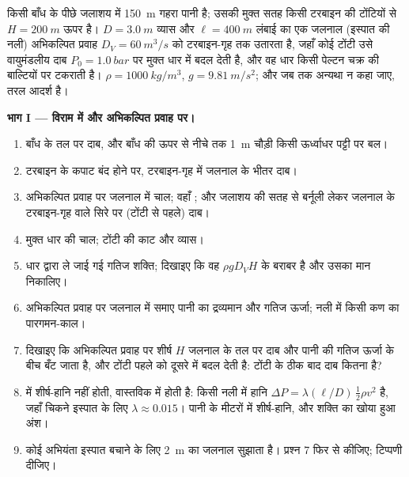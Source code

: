 \begin{problem}
\label{pb:b2:euler-bernoulli:1}

किसी बाँध के पीछे जलाशय में \qty{150}{m} गहरा पानी है; उसकी मुक्त सतह
किसी टरबाइन की टोंटियों से $H = \qty{200}{m}$ ऊपर है। $D = \qty{3.0}{m}$
व्यास और $\ell = \qty{400}{m}$ लंबाई का एक जलनाल (इस्पात की नली)
अभिकल्पित प्रवाह $D_V = \qty{60}{m^3/s}$ को टरबाइन-गृह तक उतारता है,
जहाँ कोई टोंटी उसे वायुमंडलीय दाब $P_0 =
\qty{1.0}{bar}$ पर मुक्त धार में बदल देती है, और वह धार किसी पेल्टन चक्र
की बाल्टियों पर टकराती है। $\rho =
\qty{1000}{kg/m^3}$, $g = \qty{9.81}{m/s^2}$; और जब तक अन्यथा न कहा जाए,
तरल आदर्श है।

\medskip
\noindent\textbf{भाग I --- विराम में और अभिकल्पित प्रवाह पर।}
\begin{enumerate}
  \item बाँध के तल पर दाब, और बाँध की ऊपर से नीचे तक
        \qty{1}{m} चौड़ी किसी ऊर्ध्वाधर पट्टी पर बल।
  \item टरबाइन के कपाट बंद होने पर, टरबाइन-गृह में जलनाल के
        भीतर दाब।
  \item अभिकल्पित प्रवाह पर जलनाल में चाल; वहाँ ;
        और जलाशय की सतह से बर्नूली लेकर जलनाल के टरबाइन-गृह
        वाले सिरे पर (टोंटी से पहले) दाब।
  \item मुक्त धार की चाल; टोंटी की काट और व्यास।
  \item धार द्वारा ले जाई गई गतिज शक्ति; दिखाइए कि वह $\rho gD_VH$ के
        बराबर है और उसका मान निकालिए।
  \item अभिकल्पित प्रवाह पर जलनाल में समाए पानी का द्रव्यमान और गतिज
        ऊर्जा; नली में किसी कण का पारगमन-काल।
  \item दिखाइए कि अभिकल्पित प्रवाह पर शीर्ष $H$ जलनाल के तल पर दाब
        और पानी की गतिज ऊर्जा के बीच बँट जाता है, और
        टोंटी पहले को दूसरे में बदल देती है: टोंटी के ठीक बाद दाब
        कितना है?
  \item {} में शीर्ष-हानि नहीं होती, वास्तविक में होती है: किसी
        नली में हानि $\Delta P = \lambda(\ell/D)\,\tfrac12\rho v^2$ है, जहाँ चिकने
        इस्पात के लिए $\lambda
        \approx 0.015$। पानी के मीटरों में शीर्ष-हानि, और
        शक्ति का खोया हुआ अंश।
  \item कोई अभियंता इस्पात बचाने के लिए \qty{2}{m} का जलनाल सुझाता है।
        प्रश्न 7 फिर से कीजिए; टिप्पणी दीजिए।
\end{enumerate}


\end{problem}
